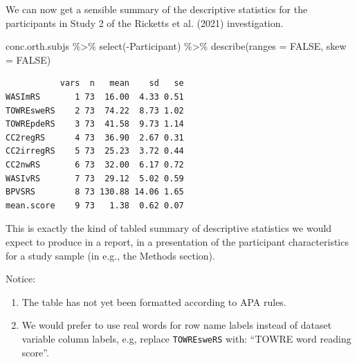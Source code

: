 \documentclass[
  letterpaper,
  DIV=11,
  numbers=noendperiod]{scrreprt}
\newenvironment{Shaded}{\begin{snugshade}}{\end{snugshade}}
\newcommand{\AttributeTok}[1]{\textcolor[rgb]{0.40,0.45,0.13}{#1}}
\newcommand{\ConstantTok}[1]{\textcolor[rgb]{0.56,0.35,0.01}{#1}}
\newcommand{\FunctionTok}[1]{\textcolor[rgb]{0.28,0.35,0.67}{#1}}
\newcommand{\NormalTok}[1]{\textcolor[rgb]{0.00,0.23,0.31}{#1}}
\newcommand{\SpecialCharTok}[1]{\textcolor[rgb]{0.37,0.37,0.37}{#1}}
\providecommand{\tightlist}{%
  \setlength{\itemsep}{0pt}\setlength{\parskip}{0pt}}\usepackage{longtable,booktabs,array}
\begin{document}
We can now get a sensible summary of the descriptive statistics for the
participants in Study 2 of the Ricketts et al. (2021) investigation.

\begin{Shaded}
\begin{Highlighting}[]
\NormalTok{conc.orth.subjs }\SpecialCharTok{\%\textgreater{}\%}
  \FunctionTok{select}\NormalTok{(}\SpecialCharTok{{-}}\NormalTok{Participant) }\SpecialCharTok{\%\textgreater{}\%}
  \FunctionTok{describe}\NormalTok{(}\AttributeTok{ranges =} \ConstantTok{FALSE}\NormalTok{, }\AttributeTok{skew =} \ConstantTok{FALSE}\NormalTok{)}
\end{Highlighting}
\end{Shaded}

\begin{verbatim}
           vars  n   mean    sd   se
WASImRS       1 73  16.00  4.33 0.51
TOWREsweRS    2 73  74.22  8.73 1.02
TOWREpdeRS    3 73  41.58  9.73 1.14
CC2regRS      4 73  36.90  2.67 0.31
CC2irregRS    5 73  25.23  3.72 0.44
CC2nwRS       6 73  32.00  6.17 0.72
WASIvRS       7 73  29.12  5.02 0.59
BPVSRS        8 73 130.88 14.06 1.65
mean.score    9 73   1.38  0.62 0.07
\end{verbatim}

\begin{tcolorbox}[enhanced jigsaw, opacitybacktitle=0.6, title=\textcolor{quarto-callout-tip-color}{\faLightbulb}\hspace{0.5em}{Tip}, arc=.35mm, colbacktitle=quarto-callout-tip-color!10!white, colframe=quarto-callout-tip-color-frame, leftrule=.75mm, opacityback=0, breakable, titlerule=0mm, left=2mm, bottomrule=.15mm, toprule=.15mm, colback=white, coltitle=black, bottomtitle=1mm, toptitle=1mm, rightrule=.15mm]

This is exactly the kind of tabled summary of descriptive statistics we
would expect to produce in a report, in a presentation of the
participant characteristics for a study sample (in e.g., the Methods
section).

Notice:

\begin{enumerate}
\def\labelenumi{\arabic{enumi}.}
\tightlist
\item
  The table has not yet been formatted according to APA rules.
\item
  We would prefer to use real words for row name labels instead of
  dataset variable column labels, e.g, replace \texttt{TOWREsweRS} with:
  ``TOWRE word reading score''.
\end{enumerate}

\end{tcolorbox}
\end{document}
